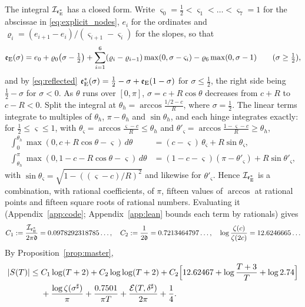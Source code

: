 \documentclass[11pt,a4paper]{article}
\makeatletter
\numberwithin{equation}{section}
\DeclareRobustCommand{\CGref}[1]{\ref{#1}}
\DeclareRobustCommand{\CGeqref}[1]{\eqref{#1}}
\let\CG@origref\ref
\let\CG@origeqref\eqref
\newcommand{\CG@gettip}[1]{\@ifundefined{CGTip@#1}{#1}{\csname CGTip@#1\endcsname}}
\DeclareRobustCommand{\CGref}[1]{\pdftooltip{\CG@origref{#1}}{\CG@gettip{#1}}}
\DeclareRobustCommand{\CGeqref}[1]{\pdftooltip{\CG@origeqref{#1}}{\CG@gettip{#1}}}
\theoremstyle{definition}
\theoremstyle{remark}
\newcommand{\eE}{\mathfrak e_{\rm E}}
\makeatother
\begin{document}
The integral $\mathcal I_{\eE^*}$ has a closed form. Write $\varsigma_0=\frac12<\varsigma_1<\dots<\varsigma_7=1$ for the abscissae in \CGeqref{eq:explicit_nodes}, $e_i$ for the ordinates and $\varrho_i=(e_{i+1}-e_i)/(\varsigma_{i+1}-\varsigma_i)$ for the slopes, so that
\[
\eE(\sigma)=e_0+\varrho_0\bigl(\sigma-\tfrac12\bigr)+\sum_{i=1}^{6}(\varrho_i-\varrho_{i-1})\max(0,\sigma-\varsigma_i)-\varrho_6\max(0,\sigma-1)\qquad(\sigma\ge\tfrac12),
\]
and by \CGeqref{eq:reflected} $\eE^*(\sigma)=\frac12-\sigma+\eE(1-\sigma)$ for $\sigma\le\frac12$, the right side being $\frac12-\sigma$ for $\sigma<0$. As $\theta$ runs over $[0,\pi]$, $\sigma=c+R\cos\theta$ decreases from $c+R$ to $c-R<0$. Split the integral at $\theta_h=\arccos\frac{1/2-c}R$, where $\sigma=\frac12$. The linear terms integrate to multiples of $\theta_h$, $\pi-\theta_h$ and $\sin\theta_h$, and each hinge integrates exactly: for $\frac12\le\varsigma\le1$, with $\theta_\varsigma=\arccos\frac{\varsigma-c}R\le\theta_h$ and $\theta'_\varsigma=\arccos\frac{1-\varsigma-c}R\ge\theta_h$,
\begin{equation}
\begin{aligned}
\int_0^{\theta_h}\max(0,c+R\cos\theta-\varsigma)\,d\theta&=(c-\varsigma)\,\theta_\varsigma+R\sin\theta_\varsigma,\\
\int_{\theta_h}^{\pi}\max(0,1-c-R\cos\theta-\varsigma)\,d\theta&=(1-c-\varsigma)(\pi-\theta'_\varsigma)+R\sin\theta'_\varsigma,
\end{aligned}
\label{eq:hinge_integrals}
\end{equation}
with $\sin\theta_\varsigma=\sqrt{1-((\varsigma-c)/R)^2}$ and likewise for $\theta'_\varsigma$. Hence $\mathcal I_{\eE^*}$ is a combination, with rational coefficients, of $\pi$, fifteen values of $\arccos$ at rational points and fifteen square roots of rational numbers. Evaluating it (Appendix~\CGref{app:code}; Appendix~\CGref{app:lean} bounds each term by rationals) gives
\begin{equation}
C_1:=\frac{\mathcal I_{\eE^*}}{2\pi\mathfrak d}=0.0978292318785\ldots,\quad C_2:=\frac1{2\mathfrak d}=0.7213464797\ldots,\quad \log\frac{\zeta(c)}{\zeta(2c)}=12.6246665\ldots
\label{eq:C1_value}
\end{equation}
By Proposition~\CGref{prop:master},
\begin{equation}
\begin{split}
|S(T)|\le{}&C_1\log(T+2)+C_2\log\log(T+2)+C_2\Bigl[12.62467+\log\frac{T+3}T+\log2.74\Bigr]\\
&+\frac{\log\zeta(\sigma^\sharp)}\pi+\frac{0.7501}{\pi T}+\frac{\mathcal E(T,\delta^\sharp)}{2\pi}+\frac14 .
\end{split}
\label{eq:explicit_assembled}
\end{equation}
\end{document}
